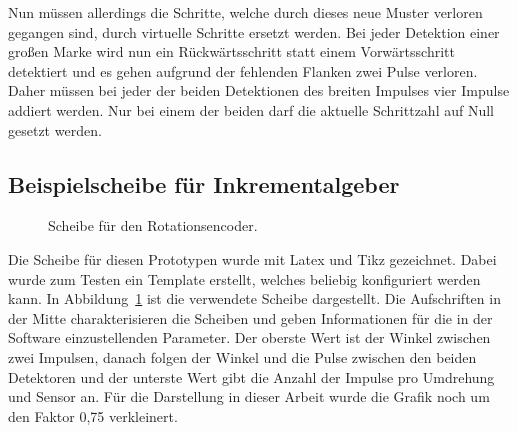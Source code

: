 Nun müssen allerdings die Schritte, welche durch dieses neue Muster verloren gegangen sind, durch virtuelle Schritte ersetzt werden.
Bei jeder Detektion einer großen Marke wird nun ein Rückwärtsschritt statt einem Vorwärtsschritt detektiert und es gehen aufgrund der fehlenden Flanken zwei Pulse verloren.
Daher müssen bei jeder der beiden Detektionen des breiten Impulses vier Impulse addiert werden.
Nur bei einem der beiden darf die aktuelle Schrittzahl auf Null gesetzt werden.


\subsection{Beispielscheibe für Inkrementalgeber}

\begin{figure}[!h] \centering
	
	\caption{Scheibe für den Rotationsencoder.}
	\label{fig:rotaryEncoderDisc}
\end{figure}

Die Scheibe für diesen Prototypen wurde mit Latex und Tikz gezeichnet.
Dabei wurde zum Testen ein Template erstellt, welches beliebig konfiguriert werden kann.
In Abbildung~\ref{fig:rotaryEncoderDisc} ist die verwendete Scheibe dargestellt.
Die Aufschriften in der Mitte charakterisieren die Scheiben und geben Informationen für die in der Software einzustellenden Parameter.
Der oberste Wert ist der Winkel zwischen zwei Impulsen, danach folgen der Winkel und die Pulse zwischen den beiden Detektoren und der unterste Wert gibt die Anzahl der Impulse pro Umdrehung und Sensor an.
Für die Darstellung in dieser Arbeit wurde die Grafik noch um den Faktor 0,75 verkleinert.
